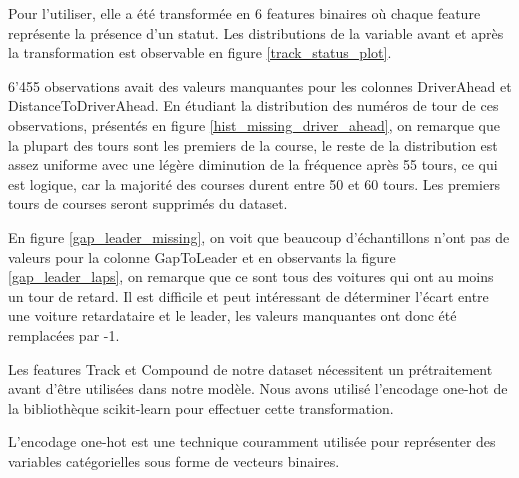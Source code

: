 Pour l'utiliser, elle a été transformée en 6 features binaires où chaque feature représente la présence d'un statut.
Les distributions de la variable avant et après la transformation est observable en figure \ref{track_status_plot}.

6'455 observations avait des valeurs manquantes pour les colonnes DriverAhead et DistanceToDriverAhead. En étudiant la distribution des numéros de tour de ces observations,
présentés en figure \ref{hist_missing_driver_ahead}, on remarque que la plupart des tours sont les premiers de la course,
le reste de la distribution est assez uniforme avec une légère diminution de la fréquence après 55 tours, ce qui est logique, car la majorité des courses durent entre 50 et 60 tours.
Les premiers tours de courses seront supprimés du dataset.


En figure \ref{gap_leader_missing}, on voit que beaucoup d'échantillons n'ont pas de valeurs pour la colonne GapToLeader et en observants la figure \ref{gap_leader_laps}, on remarque que ce sont tous des voitures qui ont au moins un tour de retard.
Il est difficile et peut intéressant de déterminer l'écart entre une voiture retardataire et le leader, les valeurs manquantes ont donc été remplacées par -1.



Les features Track et Compound de notre dataset nécessitent un prétraitement avant d'être utilisées dans notre modèle. Nous avons utilisé l'encodage one-hot de la bibliothèque scikit-learn pour effectuer cette transformation.

L'encodage one-hot est une technique couramment utilisée pour représenter des variables catégorielles sous forme de vecteurs binaires.

